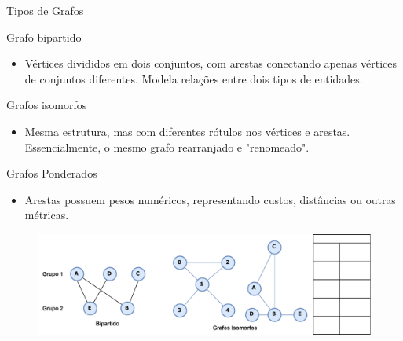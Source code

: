 \documentclass{if-beamer}
\begin{document}
\begin{frame}{Tipos de Grafos} 

\justifying
Grafo bipartido
\begin{itemize}
\item  Vértices divididos em dois conjuntos, com arestas conectando apenas vértices de conjuntos diferentes. Modela relações entre dois tipos de entidades.
\end{itemize} 
Grafos isomorfos
\begin{itemize}
\item  Mesma estrutura, mas com diferentes rótulos nos vértices e arestas. Essencialmente, o mesmo grafo rearranjado e "renomeado".
\end{itemize} 
Grafos Ponderados
\begin{itemize}
\item  Arestas possuem pesos numéricos, representando custos, distâncias ou outras métricas.
\end{itemize} 

\begin{figure}[h]
\centering

  \includegraphics[scale=0.50]{Figuras/exemplos-grafo/o_svg-tex.pdf}
  
  \label{fig:imagem5}
\end{figure}
\end{frame}
\end{document}
